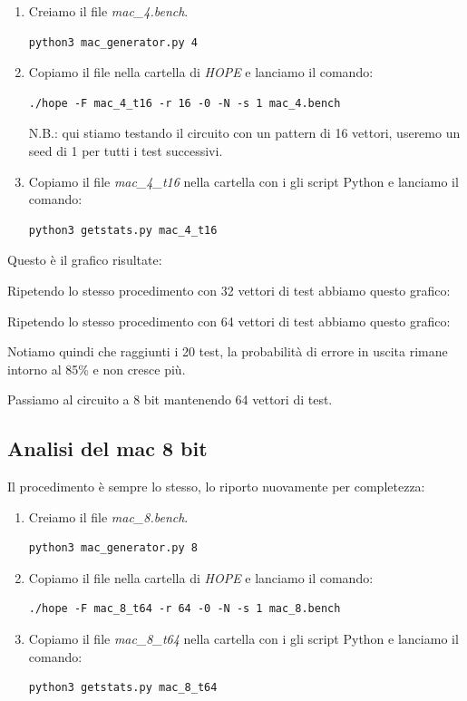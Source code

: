 \documentclass[12pt, letterpaper]{article}
\begin{document}
\begin{enumerate}
\item Creiamo il file \textit{mac\_4.bench}.
\begin{lstlisting}
python3 mac_generator.py 4
\end{lstlisting}
\item Copiamo il file nella cartella di \textit{HOPE} e lanciamo il comando:
\begin{lstlisting}
./hope -F mac_4_t16 -r 16 -0 -N -s 1 mac_4.bench
\end{lstlisting}
N.B.: qui stiamo testando il circuito con un pattern di 16 vettori, useremo un seed di 1 per tutti i test successivi.
\item Copiamo il file \textit{mac\_4\_t16} nella cartella con i gli script Python e lanciamo il comando:
\begin{lstlisting}
python3 getstats.py mac_4_t16
\end{lstlisting}
\end{enumerate}

Questo è il grafico risultate:



Ripetendo lo stesso procedimento con 32 vettori di test abbiamo questo grafico:



Ripetendo lo stesso procedimento con 64 vettori di test abbiamo questo grafico:



Notiamo quindi che raggiunti i 20 test, la probabilità di errore in uscita rimane intorno al 85\% e non cresce più.

Passiamo al circuito a 8 bit mantenendo 64 vettori di test.

\subsection{Analisi del mac 8 bit}

Il procedimento è sempre lo stesso, lo riporto nuovamente per completezza:

\begin{enumerate}
\item Creiamo il file \textit{mac\_8.bench}.
\begin{lstlisting}
python3 mac_generator.py 8
\end{lstlisting}
\item Copiamo il file nella cartella di \textit{HOPE} e lanciamo il comando:
\begin{lstlisting}
./hope -F mac_8_t64 -r 64 -0 -N -s 1 mac_8.bench
\end{lstlisting}
\item Copiamo il file \textit{mac\_8\_t64} nella cartella con i gli script Python e lanciamo il comando:
\begin{lstlisting}
python3 getstats.py mac_8_t64
\end{lstlisting}
\end{enumerate}
\end{document}
